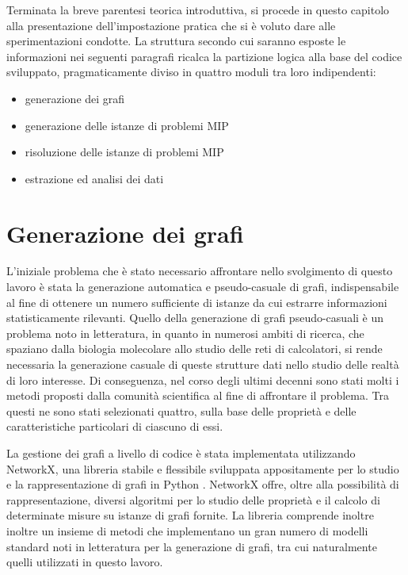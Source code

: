 {Terminata la breve parentesi teorica introduttiva,  si procede in questo capitolo alla presentazione
dell'impostazione pratica che si è voluto dare alle sperimentazioni condotte. La struttura secondo cui
saranno esposte le informazioni nei seguenti paragrafi ricalca la partizione logica alla base del codice
sviluppato, pragmaticamente diviso in quattro moduli tra loro indipendenti:}

\begin{itemize}
\item generazione dei grafi
\item generazione delle istanze di problemi MIP
\item risoluzione delle istanze di problemi MIP
\item estrazione ed analisi dei dati
\end{itemize}

\section{Generazione dei grafi}
L'iniziale problema che è stato necessario affrontare nello svolgimento di questo lavoro è stata la 
generazione automatica e pseudo-casuale di grafi, indispensabile al fine di ottenere un numero sufficiente di 
istanze da cui estrarre informazioni statisticamente rilevanti. Quello della generazione di grafi pseudo-casuali è un problema noto in letteratura, in quanto in numerosi ambiti di ricerca, che spaziano dalla biologia 
molecolare allo studio delle reti di calcolatori, si rende necessaria la generazione casuale di queste strutture 
dati nello studio delle realtà di loro interesse. 
Di conseguenza, nel corso degli ultimi decenni sono stati molti i metodi proposti dalla comunità scientifica al 
fine di affrontare il problema. Tra questi ne sono stati selezionati quattro, sulla base delle proprietà e delle caratteristiche particolari di ciascuno di essi.  

La gestione dei grafi a livello di codice è stata implementata utilizzando NetworkX, una libreria stabile e flessibile sviluppata appositamente per lo studio e la rappresentazione di grafi in Python \cite{networkx}. NetworkX offre, oltre alla possibilità di rappresentazione, diversi algoritmi per lo studio delle proprietà e il calcolo di determinate misure su istanze di grafi fornite. La libreria comprende inoltre inoltre un insieme di metodi che implementano un gran numero di modelli standard noti in letteratura per la generazione di grafi, tra cui naturalmente quelli utilizzati in questo lavoro. 

